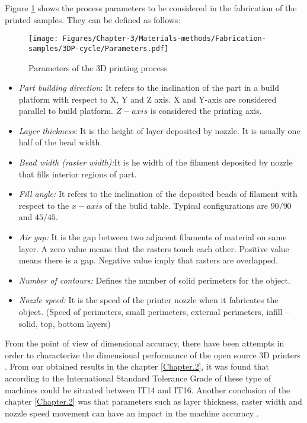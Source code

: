 \begin{enumerate}[leftmargin=0in, label=\emph{\alph*}.]
	Figure \ref{parameters.3dp} shows the process parameters to be considered in the fabrication of the printed samples. 
	They can be defined as follows:   \parencite{Croccolo2013,Sood2010, Ahn2002}
	
	\begin{figure} [H]
		\centering
		\texttt{[image: Figures/Chapter-3/Materials-methods/Fabrication-samples/3DP-cycle/Parameters.pdf]}
		\caption{Parameters of the 3D printing process}
		\label{parameters.3dp}
	\end{figure}
	
	
	\begin{itemize}[noitemsep]
		\item \textit{Part building direction}: It refers to the inclination of the part in a build platform with respect to X, Y and Z axis. X and Y-axis are considered parallel to build platform. $Z-axis$ is considered the printing axis.
		\item \textit{Layer thickness:} It is the height of layer deposited by nozzle. It is usually one half of the bead width.
		\item \textit{Bead width (raster width):}It is he width of the filament deposited by nozzle that fills interior regions of part. %
		\item \textit{Fill angle:} It refers to the inclination of the deposited beads of filament with respect to the $x-axis$ of the bulid table. Typical configurations are $90/90$ and $45/45$.
		\item \textit{Air gap:} It is the gap between two adjacent filaments of material on same layer. A zero value means that the rasters touch each other. Positive value means there is a gap. Negative value imply that rasters are overlapped.
		\item \textit{Number of contours:} Defines the number of solid perimeters for the object.
		\item \textit{Nozzle speed:} It is the speed of the printer nozzle when it fabricates the object. (Speed of perimeters, small perimeters, external perimeters, infill – solid, top, bottom layers) 
	\end{itemize}
	
	From the point of view of dimensional accuracy, there have been attempts in order to characterize the dimensional performance of the open source 3D printers \parencite{Perez2013,Roberson2013,Johnson2011,CruzSanchez2014}.
From our obtained results in the chapter \ref{Chapter.2}, it was found that according to the International Standard Tolerance Grade of these type of machines could be situated between IT14 and IT16. 
Another conclusion of the chapter \ref{Chapter.2} was that parameters such as layer thickness, raster width and nozzle speed movement can have an impact in the machine accuracy \parencite{CruzSanchez2014}.
	

\end{enumerate}
